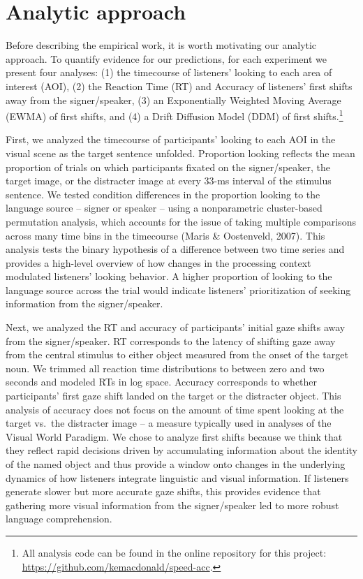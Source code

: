 \documentclass[,man,floatsintext]{apa6}
\let\rmarkdownfootnote\footnote%
\def\footnote{\protect\rmarkdownfootnote}
\begin{document}
\section{Analytic approach}\label{analytic-approach}

Before describing the empirical work, it is worth motivating our
analytic approach. To quantify evidence for our predictions, for each
experiment we present four analyses: (1) the timecourse of listeners'
looking to each area of interest (AOI), (2) the Reaction Time (RT) and
Accuracy of listeners' first shifts away from the signer/speaker, (3) an
Exponentially Weighted Moving Average (EWMA) of first shifts, and (4) a
Drift Diffusion Model (DDM) of first shifts.\footnote{All analysis code
  can be found in the online repository for this project:
  \url{https://github.com/kemacdonald/speed-acc}.}

First, we analyzed the timecourse of participants' looking to each AOI
in the visual scene as the target sentence unfolded. Proportion looking
reflects the mean proportion of trials on which participants fixated on
the signer/speaker, the target image, or the distracter image at every
33-ms interval of the stimulus sentence. We tested condition differences
in the proportion looking to the language source -- signer or speaker --
using a nonparametric cluster-based permutation analysis, which accounts
for the issue of taking multiple comparisons across many time bins in
the timecourse (Maris \& Oostenveld, 2007). This analysis tests the
binary hypothesis of a difference between two time series and provides a
high-level overview of how changes in the processing context modulated
listeners' looking behavior. A higher proportion of looking to the
language source across the trial would indicate listeners'
prioritization of seeking information from the signer/speaker.

Next, we analyzed the RT and accuracy of participants' initial gaze
shifts away from the signer/speaker. RT corresponds to the latency of
shifting gaze away from the central stimulus to either object measured
from the onset of the target noun. We trimmed all reaction time
distributions to between zero and two seconds and modeled RTs in log
space. Accuracy corresponds to whether participants' first gaze shift
landed on the target or the distracter object. This analysis of accuracy
does not focus on the amount of time spent looking at the target vs.~the
distracter image -- a measure typically used in analyses of the Visual
World Paradigm. We chose to analyze first shifts because we think that
they reflect rapid decisions driven by accumulating information about
the identity of the named object and thus provide a window onto changes
in the underlying dynamics of how listeners integrate linguistic and
visual information. If listeners generate slower but more accurate gaze
shifts, this provides evidence that gathering more visual information
from the signer/speaker led to more robust language comprehension.
\end{document}
